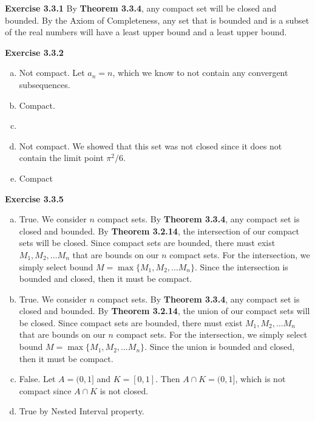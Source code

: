 \documentclass{article}
\begin{document}
\textbf{Exercise 3.3.1}
By \textbf{Theorem 3.3.4}, any compact set will be closed and bounded. By the Axiom
of Completeness, any set that is bounded and is  a subset of the real numbers will have a least
upper bound and a least upper bound.

\textbf{Exercise 3.3.2}
\begin{enumerate}[(a)]
\item Not compact. Let \(a_{n} = n\), which we know to not contain any convergent subsequences. 
\item Compact.
\item
\item Not compact. We showed that this set was not closed since it does not contain
  the limit point \(\pi^{2} / 6\).
  \item Compact
\end{enumerate}

\textbf{Exercise 3.3.5}
\begin{enumerate}[(a)]
\item True. We consider \(n\) compact sets. By \textbf{Theorem 3.3.4}, any compact set is closed and bounded. By
  \textbf{Theorem 3.2.14}, the intersection of our compact sets will be closed.
  Since compact sets are bounded, there must exist \(M_{1}, M_{2}, \ldots M_{n}\)
  that are bounds on our \(n\) compact sets. For the intersection, we simply select
  bound \(M = \max\{M_{1}, M_{2}, \ldots M_{n}\}\). Since the intersection is bounded
  and closed, then it must be compact.
  
  \item True. We consider \(n\) compact sets. By \textbf{Theorem 3.3.4}, any compact set is closed and bounded. By
  \textbf{Theorem 3.2.14}, the union of our compact sets will be closed.
  Since compact sets are bounded, there must exist \(M_{1}, M_{2}, \ldots M_{n}\)
  that are bounds on our \(n\) compact sets. For the intersection, we simply select
  bound \(M = \max\{M_{1}, M_{2}, \ldots M_{n}\}\). Since the union is bounded
  and closed, then it must be compact.

\item False. Let \(A = (0, 1]\) and \(K = [0, 1]\). Then \(A \cap K = (0, 1]\),
    which is not compact since \(A \cap K\) is not closed.

    \item True by Nested Interval property. 
  \end{enumerate}
\end{document}
